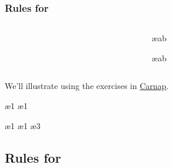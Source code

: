 \begin{frame}
  \frametitle{Rules for \eand}
  \begin{columns}
    \begin{column}{3cm}
  \begin{fitchproof}
     
  \end{fitchproof}
\end{column}
\begin{column}{3cm}
  \begin{fitchproof}
     \ae{ab}
  \end{fitchproof}
  \begin{fitchproof}
     \ae{ab}
  \end{fitchproof}
\end{column}
\end{columns}
We'll illustrate using the exercises in \href{https://carnap.io/shared/rzach@ucalgary.ca/Practice\%20Problems\%20IV.md}{Carnap}.
\end{frame}

\begin{frame}
  \begin{fitchproof}
    \ae{1}
    \ae{1}
  \end{fitchproof}
\end{frame}

\begin{frame}
  \begin{fitchproof}
    \ae{1}
    \ae{1}
    \ae{3}
  \end{fitchproof}
\end{frame}

\subsection{Rules for \eif}

